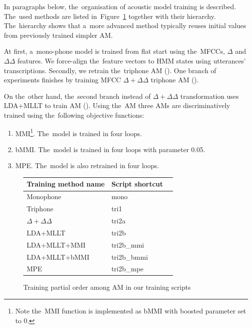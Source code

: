 In paragraphs below, the~organisation of acoustic model training is described. 
The~used methods are listed in~Figure~\ref{fig:am-deps} together with their hierarchy.
The~hierarchy shows that a~more advanced method typically reuses initial values from previously trained simpler \ac{AM}.

At first, a~mono-phone model is trained from flat start using the~MFCCs, $\Delta$ and $\Delta \Delta$ features.
We force-align the~feature vectors to HMM states using utterances' transcriptions.
Secondly, we retrain the~triphone \ac{AM} ().
One branch of experiments finishes by training \ac{MFCC} $\Delta + \Delta\Delta$ triphone \ac{AM} (). %

On the~other hand, the~second branch instead of $\Delta + \Delta\Delta$ transformation uses \ac{LDA}+\ac{MLLT} to train \ac{AM} ().
Using the~\ac{AM}  three \acp{AM} are discriminatively trained using the~following objective functions:
\begin{enumerate}
    \item \acl{MMI}\cite{chow1990maximum}\footnote{Note the~\ac{MMI} function is implemented as \acs{bMMI} with boosted parameter set to 0.}. The~model  is trained in four loops.
    \item \acl{bMMI}\cite{povey2008boosted}. The~model  is trained in four loops with parameter 0.05.
    \item \acl{MPE}\cite{povey2003mmi}. The~model  is also retrained in four loops.
\end{enumerate}

\begin{figure}[!htp]
    \begin{center}
    
    \small{\begin{tabular}{lll}
    \hline
    Training method name & Script shortcut \\
    \hline
    Monophone & mono \\
    Triphone  & tri1 \\
    $\Delta + \Delta\Delta$ & tri2a  \\
    \acs{LDA}+\acs{MLLT} & tri2b  \\
    \acs{LDA}+\acs{MLLT}+\acs{MMI} & tri2b\_mmi \\
    \acs{LDA}+\acs{MLLT}+\acs{bMMI} & tri2b\_bmmi \\
    \acs{MPE} & tri2b\_mpe \\
    \hline
    \end{tabular}}
    \end{center}
    \caption{Training partial order among \ac{AM} in our training scripts}
    \label{fig:am-deps} 
\end{figure}

